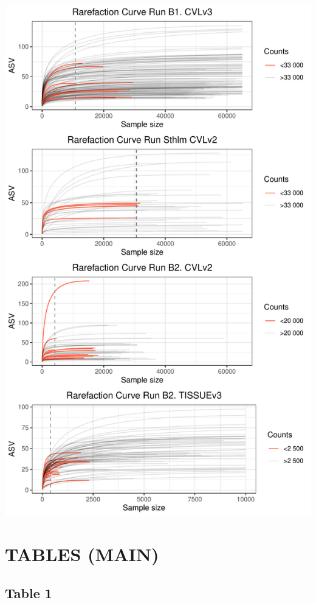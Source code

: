 \documentclass[
]{article}
\begin{document}
\includegraphics[width=1\linewidth]{manuscript_template_files/figure-latex/unnamed-chunk-20-6}

\clearpage

\hypertarget{tables-main}{%
\section{TABLES (MAIN)}\label{tables-main}}

\hypertarget{table-1}{%
\subsection{Table 1}\label{table-1}}
\end{document}

